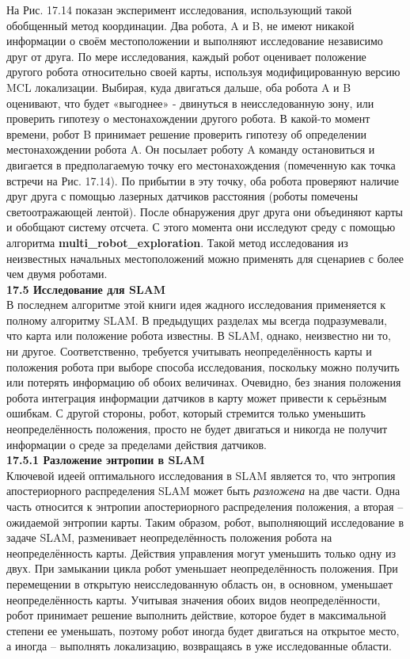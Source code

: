 \documentclass[10pt,a4paper]{article}
\begin{document}
На Рис. 17.14 показан эксперимент исследования, использующий такой обобщенный метод координации. Два робота, A и B, не имеют никакой информации о своём местоположении и выполняют исследование независимо друг от друга. По мере исследования, каждый робот оценивает положение другого робота относительно своей карты, используя модифицированную версию MCL локализации. Выбирая, куда двигаться дальше, оба робота A и B оценивают, что будет «выгоднее» - двинуться в неисследованную зону, или проверить гипотезу о местонахождении другого робота. В какой-то момент времени, робот B принимает решение проверить гипотезу об определении местонахождении робота A. Он посылает роботу A команду остановиться и двигается в предполагаемую точку его местонахождения (помеченную как точка встречи на Рис. 17.14). По прибытии в эту точку, оба робота проверяют наличие друг друга с помощью лазерных датчиков расстояния (роботы помечены светоотражающей лентой). После обнаружения друг друга они объединяют карты и обобщают систему отсчета. С этого момента они исследуют среду с помощью алгоритма \textbf{multi\_robot\_exploration}. Такой метод исследования из неизвестных начальных местоположений можно применять для сценариев с более чем двумя роботами.\\

\textbf{17.5	Исследование для SLAM}\\

В последнем алгоритме этой книги идея жадного исследования применяется к полному алгоритму SLAM. В предыдущих разделах мы всегда подразумевали, что карта или положение робота известны. В SLAM, однако, неизвестно ни то, ни другое. Соответственно, требуется учитывать неопределённость карты и положения робота при выборе способа исследования, поскольку можно получить или потерять информацию об обоих величинах. Очевидно, без знания положения робота интеграция информации датчиков в карту может привести к серьёзным ошибкам. С другой стороны, робот, который стремится только уменьшить неопределённость положения, просто не будет двигаться и никогда не получит информации о среде за пределами действия датчиков.\\

\textbf{17.5.1	Разложение энтропии в SLAM}\\

Ключевой идеей оптимального исследования в SLAM является то, что энтропия апостериорного распределения SLAM может быть \textit{разложена} на две части. Одна часть относится к энтропии апостериорного распределения положения, а вторая – ожидаемой энтропии карты. Таким образом, робот, выполняющий исследование в задаче SLAM, разменивает неопределённость положения робота на неопределённость карты. Действия управления могут уменьшить только одну из двух. При замыкании цикла робот уменьшает неопределённость положения. При перемещении в открытую неисследованную область он, в основном, уменьшает неопределённость карты. Учитывая значения обоих видов неопределённости, робот принимает решение выполнить действие, которое будет в максимальной степени ее уменьшать, поэтому робот иногда будет двигаться на открытое место, а иногда – выполнять локализацию, возвращаясь в уже исследованные области.
\end{document}
